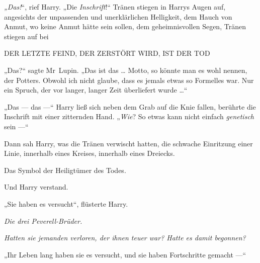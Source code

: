 \emph{„Das!}“, rief Harry.
„Die \emph{Inschrift}!“
Tränen stiegen in Harrys Augen auf, angesichts der unpassenden und unerklärlichen Helligkeit, dem Hauch von Anmut, wo keine Anmut hätte sein sollen, dem geheimnisvollen Segen, Tränen stiegen auf bei

\begin{center}
DER LETZTE FEIND, DER ZERSTÖRT WIRD, IST DER TOD
\end{center}

„Das?“ sagte Mr~Lupin.
„Das ist das … Motto, so könnte man es wohl nennen, der Potters. Obwohl ich nicht glaube, dass es jemals etwas so Formelles war. Nur ein Spruch, der vor langer, langer Zeit überliefert wurde …“

„Das — das —“ Harry ließ sich neben dem Grab auf die Knie fallen, berührte die Inschrift mit einer zitternden Hand.
„\emph{Wie}? So etwas kann nicht einfach \emph{genetisch} sein —“

Dann sah Harry, was die Tränen verwischt hatten, die schwache Einritzung einer Linie, innerhalb eines Kreises, innerhalb eines Dreiecks.

Das Symbol der Heiligtümer des Todes.

Und Harry verstand.

„Sie haben es versucht“, flüsterte Harry.

\emph{Die drei Peverell-Brüder.}

\emph{Hatten sie jemanden verloren, der ihnen teuer war? Hatte es damit begonnen?}

„Ihr Leben lang haben sie es versucht, und sie haben Fortschritte gemacht —“


